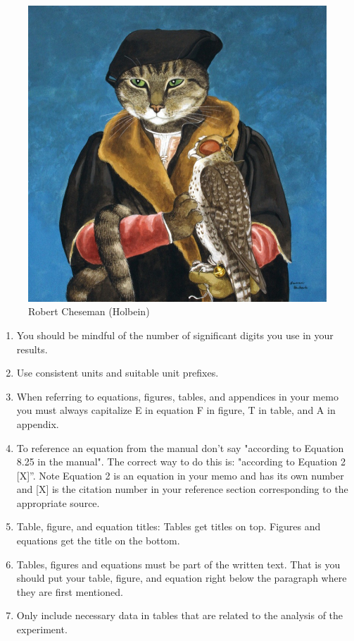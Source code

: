\documentclass[11pt,letter]{report}
\begin{document}
\begin{figure}[!htb]
\label{fig:Cat Lord}
\centering
\includegraphics[scale=0.4]{cat-painting}%
\caption{Robert Cheseman (Holbein)\cite{Herbert}}
\end{figure}

\begin{enumerate} %
  \item You should be mindful of the number of significant digits you use in your results.
  \item Use consistent units and suitable unit prefixes.
  \item When referring to equations, figures, tables, and appendices in your memo you must always capitalize E in equation F in figure, T in table, and A in appendix.
  \item To reference an equation from the manual don't say "according to Equation 8.25 in the manual". The correct way to do this is: "according to Equation 2 [X]”. Note Equation 2 is an equation in your memo and has its own number and [X] is the citation number in your reference section corresponding to the appropriate source.
  \item Table, figure, and equation titles: Tables get titles on top. Figures and equations get the title on the bottom.
  \item Tables, figures and equations must be part of the written text. That is you should put your table, figure, and equation right below the paragraph where they are first mentioned.
  \item Only include necessary data in tables that are related to the analysis of the experiment.
\end{enumerate}
\end{document}
